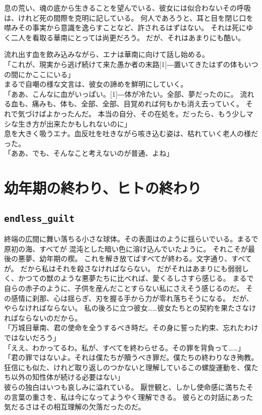 \documentclass[autodetect-engine,dvipdfmx-if-dvi,a5paper,ja=standard,twoside,titlepage,final,twocolumn]{ltjtbook}
\begin{document}
息の荒い、魂の底から生きることを望んでいる、彼女には似合わないその呼吸は、けれど死の間際を克明に記している。
何人であろうと、耳と目を閉じ口を噤みその事実から意識を逸らすことなど、許されるはずはない。
それは死にゆく二人を看取る華南にとっては尚更だろう。
だが、それはあまりにも酷い。

流れ出す血を飲み込みながら、エナは華南に向けて話し始める。\\
「これが、現実から逃げ続けて来た愚か者の末路\scalebox{3}[1]{―}置いてきたはずの体もいつの間にかここにいる」\\
まるで自嘲の様な文言は、彼女の諦めを鮮明にしていく。\\
「ああ、こんなに血がいっぱい。\scalebox{3}[1]{―}体が冷たい。全部、夢だったのに。
流れる血も、痛みも、体も、全部、全部、目覚めれば何もかも消え去っていく。
それで気づけばよかったんだ。
本当の自分、その在処を。だったら、もう少しマシな生き方が出来たかもしれないのに」\\
息を大きく吸うエナ。血反吐を吐きながら咳き込む姿は、枯れていく老人の様だった。\\
「ああ、でも、そんなこと考えないのが普通、よね」\\


\chapter{\rm 幼年期の終わり、ヒトの終わり}
\section{\tt \large endless\_guilt}
終端の広間に舞い落ちる小さな球体。その表面はのように揺らいでいる。まるで原初の海、すべてが
混沌とした暗い色に溶け込んでいたように。
それこそが最後の悪夢、幼年期の楔。
これを解き放てばすべてが終わる。文字通り、すべてが。
だから私はそれを殺さなければならない。
だがそれはあまりにも弱弱しく、かつての獣のような悪夢たちに比べれば、愛くるしさすら感じる。
まるで自らの赤子のように、子供を産んだことすらない私にさえそう感じるのだ。
その感情に刹那、心は揺らぎ、刃を握る手から力が零れ落ちそうになる。
だが、やらなければならない。
私の後ろに立つ彼女……彼女たちとの契約を果たさなければならないのだから。\\
「万城目華南、君の使命を全うするべき時だ。その身に誓った約束、忘れたわけではないだろう」\\
「ええ、わかってるわ。私が、すべてを終わらせる。その罪を背負って……」\\
「君の罪ではないよ。それは僕たちが贖うべき罪だ。僕たちの終わりなき殉教。
狂信にも似た、けれど取り返しのつかないと理解しているこの螺旋運動を、僕たち以外の知性体が続ける必要はない」\\
彼らの独白はいつも哀しみに溢れている。
厭世観と、しかし使命感に満ちたその言葉の重さを、私は今になってようやく理解できる。
彼らとの対話にあった気だるさはその相互理解の欠落だったのだ。
\end{document}
